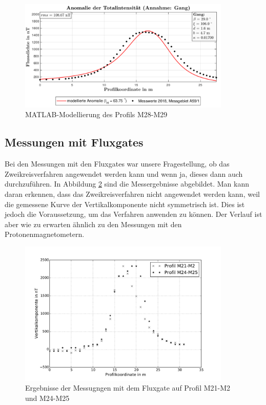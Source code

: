 \begin{figure}
 \centering
 \includegraphics[width=0.9\textwidth]{fig/modM28}
 \caption{MATLAB-Modellierung des Profils M28-M29}
 \label{fig:modM28}
\end{figure}

\subsection{Messungen mit Fluxgates}

Bei den Messungen mit den Fluxgates war unsere Fragestellung, ob das Zweikreisverfahren angewendet werden kann und wenn ja, dieses dann auch durchzuführen. In Abbildung \ref{fig:flux} sind die Messergebnisse abgebildet. Man kann daran erkennen, dass das Zweikreisverfahren nicht angewendet werden kann, weil die gemessene Kurve der Vertikalkomponente nicht symmetrisch ist. Dies ist jedoch die Voraussetzung, um das Verfahren anwenden zu können. Der Verlauf ist aber wie zu erwarten ähnlich zu den Messungen mit den Protonenmagnetometern. 

\begin{figure}
 \centering
 \includegraphics[width=0.9\textwidth]{fig/fluxgate}
 \caption{Ergebnisse der Messugngen mit dem Fluxgate auf Profil M21-M2 und M24-M25}
 \label{fig:flux}
\end{figure}

